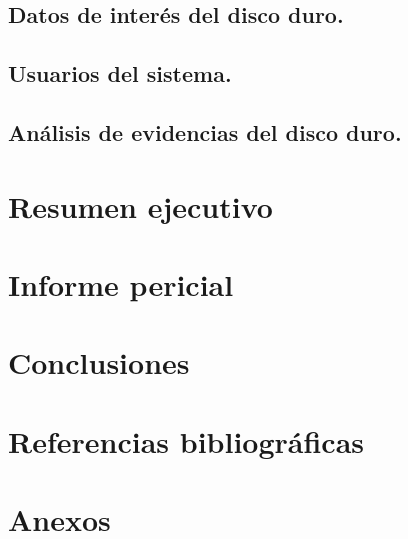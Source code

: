 \documentclass[12pt,a4paper]{report}
\begin{document}
\section{Datos de interés del disco duro.}


\section{Usuarios del sistema.}


\section{Análisis de evidencias del disco duro.}


\chapter{Resumen ejecutivo}


\chapter{Informe pericial}


\chapter{Conclusiones}


\chapter{Referencias bibliográficas}


\chapter{Anexos}

\end{document}
